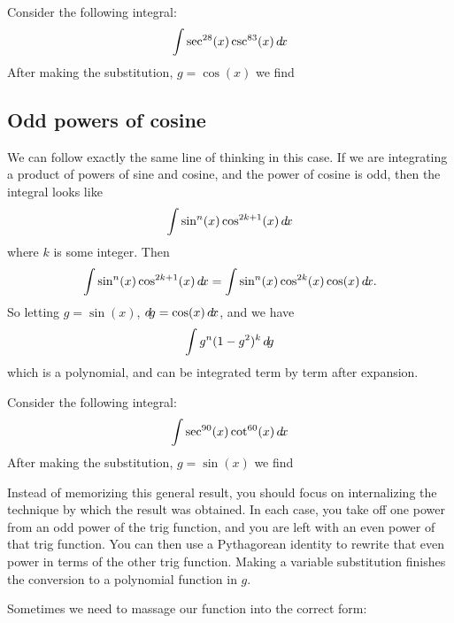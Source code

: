 \documentclass{ximera}
\begin{document}
\begin{question}
  Consider the following integral:
  \[
  \int \sec^{28}(x)\csc^{83}(x) \mathop{}\!d\! x
  \]
  After making the substitution, $g = \cos(x)$ we find
  \begin{multipleChoice}
  \end{multipleChoice}
\end{question}



\subsection{Odd powers of cosine}

We can follow exactly the same line of thinking in this case. If we
are integrating a product of powers of sine and cosine, and the power
of cosine is odd, then the integral looks like
\[
\int \sin^n(x) \cos^{2k+1}(x) \mathop{}\!d\! x
\]
where $k$ is some integer. Then
\[
\int \sin^n(x) \cos^{2k+1}(x) \mathop{}\!d\! x = \int \sin^n(x) \cos^{2k}(x) \cos(x) \mathop{}\!d\! x.
\]
So letting $g = \sin(x)$, $\mathop{}\!d\! g =\cos(x) \mathop{}\!d\! x$, and we have 
\[
\int g^n(1-g^2)^k \mathop{}\!d\! g
\]
which is a polynomial, and can be integrated term by term after
expansion.

\begin{question}
  Consider the following integral:
  \[
  \int \sec^{90}(x) \cot^{60}(x)  \mathop{}\!d\! x
  \]
  After making the substitution, $g = \sin(x)$ we find
  \begin{multipleChoice}
  \end{multipleChoice}
\end{question}


\begin{warning}
Instead of memorizing this general result, you should focus on
internalizing the technique by which the result was obtained.  In each
case, you take off one power from an odd power of the trig function,
and you are left with an even power of that trig function.  You can
then use a Pythagorean identity to rewrite that even power in terms of
the other trig function.  Making a variable substitution finishes the
conversion to a polynomial function in $g$.
\end{warning}



Sometimes we need to massage our function into the correct form:
\end{document}
